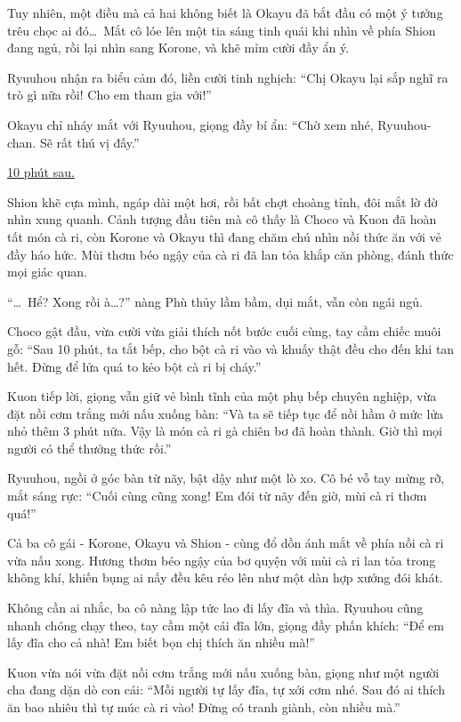 \documentclass[../main.tex]{subfiles}
\begin{document}
Tuy nhiên, một điều mà cả hai không biết là Okayu đã bắt đầu có một ý tưởng trêu chọc ai đó\dots\ Mắt cô lóe lên một tia sáng tinh quái khi nhìn về phía Shion đang ngủ, rồi lại nhìn sang Korone, và khẽ mỉm cười đầy ẩn ý.

Ryuuhou nhận ra biểu cảm đó, liền cười tinh nghịch: ``Chị Okayu lại sắp nghĩ ra trò gì nữa rồi! Cho em tham gia với!''

Okayu chỉ nháy mắt với Ryuuhou, giọng đầy bí ẩn: ``Chờ xem nhé, Ryuuhou-chan. Sẽ rất thú vị đấy.''

\begin{center}
  \uline{10 phút sau.}
\end{center}

Shion khẽ cựa mình, ngáp dài một hơi, rồi bất chợt choàng tỉnh, đôi mắt lờ đờ nhìn xung quanh. Cảnh tượng đầu tiên mà cô thấy là Choco và Kuon đã hoàn tất món cà ri, còn Korone và Okayu thì đang chăm chú nhìn nồi thức ăn với vẻ đầy háo hức. Mùi thơm béo ngậy của cà ri đã lan tỏa khắp căn phòng, đánh thức mọi giác quan.

``\dots\ Hể? Xong rồi à\dots?'' nàng Phù thủy lầm bầm, dụi mắt, vẫn còn ngái ngủ.

Choco gật đầu, vừa cười vừa giải thích nốt bước cuối cùng, tay cầm chiếc muôi gỗ: ``Sau 10 phút, ta tắt bếp, cho bột cà ri vào và khuấy thật đều cho đến khi tan hết. Đừng để lửa quá to kẻo bột cà ri bị cháy.''

Kuon tiếp lời, giọng vẫn giữ vẻ bình tĩnh của một phụ bếp chuyên nghiệp, vừa đặt nồi cơm trắng mới nấu xuống bàn: ``Và ta sẽ tiếp tục để nồi hầm ở mức lửa nhỏ thêm 3 phút nữa. Vậy là món cà ri gà chiên bơ đã hoàn thành. Giờ thì mọi người có thể thưởng thức rồi.''

Ryuuhou, ngồi ở góc bàn từ nãy, bật dậy như một lò xo. Cô bé vỗ tay mừng rỡ, mắt sáng rực: ``Cuối cùng cũng xong! Em đói từ nãy đến giờ, mùi cà ri thơm quá!''

Cả ba cô gái - Korone, Okayu và Shion - cùng đổ dồn ánh mắt về phía nồi cà ri vừa nấu xong. Hương thơm béo ngậy của bơ quyện với mùi cà ri lan tỏa trong không khí, khiến bụng ai nấy đều kêu réo lên như một dàn hợp xướng đói khát.


Không cần ai nhắc, ba cô nàng lập tức lao đi lấy đĩa và thìa. Ryuuhou cũng nhanh chóng chạy theo, tay cầm một cái đĩa lớn, giọng đầy phấn khích: ``Để em lấy đĩa cho cả nhà! Em biết bọn chị thích ăn nhiều mà!''

Kuon vừa nói vừa đặt nồi cơm trắng mới nấu xuống bàn, giọng như một người cha đang dặn dò con cái: ``Mỗi người tự lấy đĩa, tự xới cơm nhé. Sau đó ai thích ăn bao nhiêu thì tự múc cà ri vào! Đừng có tranh giành, còn nhiều mà.''
\end{document}
